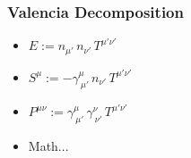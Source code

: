 \documentclass{beamer}
\begin{document}
\begin{frame}
\frametitle{Valencia Decomposition}

  \begin{itemize}[<+->]
    \item[]
      $E:=n_{\mu'}\,n_{\nu'}\,T^{\mu'\nu'}$\\[1em]
    \item[]
      $S^{\mu}:=-\gamma^{\mu}_{~\mu'}\,n_{\nu'}\,T^{\mu'\nu'}$\\[1em]
    \item[]
      $P^{\mu\nu}:=\gamma^{\mu}_{~\mu'}\,\gamma^{\nu}_{~\nu'}\,
      T^{\mu'\nu'}$\\[1em]
    \item[]
      Math...
  \end{itemize}

\end{frame}
\end{document}
